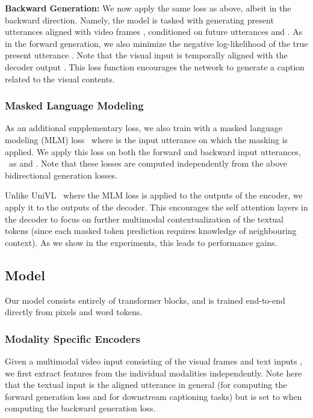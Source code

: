 \documentclass[10pt,twocolumn,letterpaper]{article}
\begin{document}
\noindent\textbf{Backward Generation:}
We now apply the same loss as above, albeit in the backward direction. 
Namely, the model is tasked with generating present utterances  aligned with video frames , conditioned on future utterances  and .
As in the forward generation, we also minimize the negative log-likelihood of the true present utterance .
Note that the visual input  is temporally aligned with the decoder output .
This loss function encourages the network to generate a caption related to the visual contents.

\subsubsection{Masked Language Modeling}
\label{sec:mlm}
As an additional supplementary loss, we also train with a masked language modeling (MLM) loss~\cite{devlin2018bert}
 where  is the input utterance on which the masking is applied.
We apply this loss on both the forward and backward input utterances, \ie\ as  and .
Note that these losses are computed independently from the above bidirectional generation losses.

Unlike UniVL~\cite{luo2020univl} where the MLM loss is applied to the outputs of the encoder, we apply it to the outputs of the decoder. This encourages the self attention layers in the decoder to focus on further multimodal contextualization of the textual tokens (since each masked token prediction requires knowledge of neighbouring context). As we show in the experiments, this leads to performance gains.






\subsection{Model} \label{sec:architecture}
Our model consists entirely of transformer blocks, and is trained end-to-end directly from pixels and word tokens. 

\subsubsection{Modality Specific Encoders}
Given a multimodal video input consisting of the visual frames  and text inputs , we first extract features from the individual modalities independently. 
Note here that the textual input  is the aligned utterance  in general (for computing the forward generation loss and for downstream captioning tasks) but is set to  when computing the backward generation loss.
\end{document}
